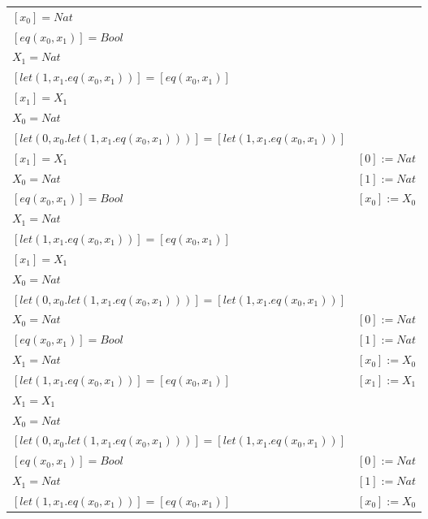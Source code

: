 \begin{exercise}
\begin{description}
\begin{center}
\begin{longtable}{ | l | l | }
                        $[x_0] = Nat$  & \\
                        $[eq(x_0,x_1)] = Bool$  & \\
                        $X_1 = Nat$ & \\
                        $[let(1,x_1.eq(x_0,x_1))] = [eq(x_0,x_1)]$  & \\
                        $[x_1] = X_1$  & \\
                        $X_0 = Nat$ & \\
                        $[let(0,x_0.let(1,x_1.eq(x_0,x_1)))] = [let(1,x_1.eq(x_0,x_1))]$ & \\
                      \hline
                        $[x_1] = X_1$  &   $[0] := Nat$\\
                        $X_0 = Nat$  & $[1] := Nat$ \\
                        $[eq(x_0,x_1)] = Bool$  &  $[x_0] := X_0$ \\
                        $X_1 = Nat$ & \\
                        $[let(1,x_1.eq(x_0,x_1))] = [eq(x_0,x_1)]$  & \\
                        $[x_1] = X_1$  & \\
                        $X_0 = Nat$ & \\
                        $[let(0,x_0.let(1,x_1.eq(x_0,x_1)))] = [let(1,x_1.eq(x_0,x_1))]$ & \\
                      \hline
                        $X_0 = Nat$  & $[0] := Nat$ \\
                        $[eq(x_0,x_1)] = Bool$  &  $[1] := Nat$ \\
                        $X_1 = Nat$ & $[x_0] := X_0$  \\
                        $[let(1,x_1.eq(x_0,x_1))] = [eq(x_0,x_1)]$  &  $[x_1] := X_1$ \\
                        $X_1 = X_1$  & \\
                        $X_0 = Nat$ & \\
                        $[let(0,x_0.let(1,x_1.eq(x_0,x_1)))] = [let(1,x_1.eq(x_0,x_1))]$ & \\
                      \hline
                        $[eq(x_0,x_1)] = Bool$  & $[0] := Nat$ \\
                        $X_1 = Nat$ & $[1] := Nat$ \\
                        $[let(1,x_1.eq(x_0,x_1))] = [eq(x_0,x_1)]$  & $[x_0] := X_0$ \\

\end{longtable}
\end{center}
\end{description}
\end{exercise}
